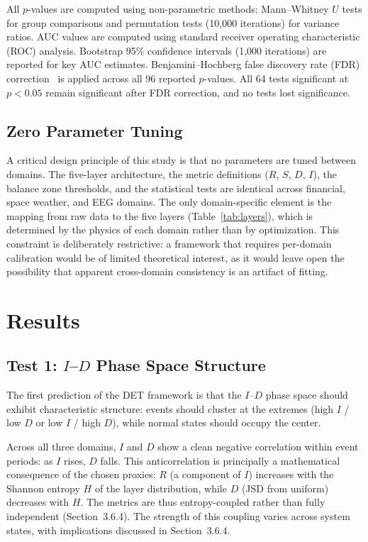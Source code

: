 \documentclass[12pt,a4paper]{article}
\begin{document}
All $p$-values are computed using non-parametric methods: Mann--Whitney $U$ tests for group comparisons and permutation tests (10,000 iterations) for variance ratios. AUC values are computed using standard receiver operating characteristic (ROC) analysis. Bootstrap 95\% confidence intervals (1,000 iterations) are reported for key AUC estimates. Benjamini--Hochberg false discovery rate (FDR) correction~\cite{benjamini1995} is applied across all 96 reported $p$-values. All 64 tests significant at $p < 0.05$ remain significant after FDR correction, and no tests lost significance.

\subsection{Zero Parameter Tuning}

A critical design principle of this study is that no parameters are tuned between domains. The five-layer architecture, the metric definitions ($R$, $S$, $D$, $I$), the balance zone thresholds, and the statistical tests are identical across financial, space weather, and EEG domains. The only domain-specific element is the mapping from raw data to the five layers (Table~\ref{tab:layers}), which is determined by the physics of each domain rather than by optimization. This constraint is deliberately restrictive: a framework that requires per-domain calibration would be of limited theoretical interest, as it would leave open the possibility that apparent cross-domain consistency is an artifact of fitting.


\section{Results}

\subsection{Test 1: $I$--$D$ Phase Space Structure}

The first prediction of the DET framework is that the $I$--$D$ phase space should exhibit characteristic structure: events should cluster at the extremes (high $I$ / low $D$ or low $I$ / high $D$), while normal states should occupy the center.

Across all three domains, $I$ and $D$ show a clean negative correlation within event periods: as $I$ rises, $D$ falls. This anticorrelation is principally a mathematical consequence of the chosen proxies: $R$ (a component of $I$) increases with the Shannon entropy $H$ of the layer distribution, while $D$ (JSD from uniform) decreases with $H$. The metrics are thus entropy-coupled rather than fully independent (Section~3.6.4). The strength of this coupling varies across system states, with implications discussed in Section~3.6.4.
\end{document}
